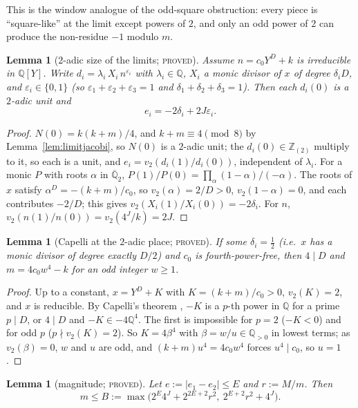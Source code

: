 \documentclass[11pt,reqno]{amsart}
\newtheorem{lemma}[theorem]{Lemma}
\theoremstyle{definition}
\newcommand{\Z}{\mathbb Z}
\newcommand{\Q}{\mathbb Q}
\newcommand{\status}[1]{\textup{\textsc{#1}}}
\begin{document}
This is the window analogue of the odd-square obstruction: every piece is
``square-like'' at the limit except powers of $2$, and only an odd power of
$2$ can produce the non-residue $-1$ modulo $m$.

\begin{lemma}[$2$-adic size of the limits; \status{proved}]\label{lem:twoadic}
Assume $n=c_0Y^D+k$ is irreducible in $\Q[Y]$.  Write $d_i=\lambda_i\,X_i\,
n^{\varepsilon_i}$ with $\lambda_i\in\Q$, $X_i$ a monic divisor of $x$ of
degree $\delta_iD$, and $\varepsilon_i\in\{0,1\}$ \textup{(}so
$\varepsilon_1+\varepsilon_2+\varepsilon_3=1$ and
$\delta_1+\delta_2+\delta_3=1$\textup{)}.  Then each $d_i(0)$ is a $2$-adic
unit and
\[
  e_i=-2\delta_i+2J\varepsilon_i .
\]
\end{lemma}

\begin{proof}
$N(0)=k(k+m)/4$, and $k+m\equiv4\pmod8$ by Lemma~\ref{lem:limitjacobi}, so
$N(0)$ is a $2$-adic unit; the $d_i(0)\in\Z_{(2)}$ multiply to it, so each is
a unit, and $e_i=v_2(d_i(1)/d_i(0))$, independent of $\lambda_i$.  For a
monic $P$ with roots $\alpha$ in $\overline{\Q}_2$,
$P(1)/P(0)=\prod_\alpha(1-\alpha)/(-\alpha)$.  The roots of $x$ satisfy
$\alpha^D=-(k+m)/c_0$, so $v_2(\alpha)=2/D>0$, $v_2(1-\alpha)=0$, and each
contributes $-2/D$; this gives $v_2(X_i(1)/X_i(0))=-2\delta_i$.  For $n$,
$v_2(n(1)/n(0))=v_2(4^J/k)=2J$.
\end{proof}

\begin{lemma}[Capelli at the $2$-adic place; \status{proved}]\label{lem:capelli}
If some $\delta_i=\frac12$ \textup{(}i.e.\ $x$ has a monic divisor of degree
exactly $D/2$\textup{)} and $c_0$ is fourth-power-free, then $4\mid D$ and
$m=4c_0w^4-k$ for an odd integer $w\ge1$.
\end{lemma}

\begin{proof}
Up to a constant, $x=Y^D+K$ with $K=(k+m)/c_0>0$, $v_2(K)=2$, and $x$ is
reducible.  By Capelli's theorem \cite[Ch.~VI, Thm.~9.1]{Lang}, $-K$ is a
$p$-th power in $\Q$ for a prime $p\mid D$, or $4\mid D$ and $-K\in-4\Q^4$.
The first is impossible for $p=2$ ($-K<0$) and for odd $p$ ($p\nmid
v_2(K)=2$).  So $K=4\beta^4$ with $\beta=w/u\in\Q_{>0}$ in lowest terms; as
$v_2(\beta)=0$, $w$ and $u$ are odd, and $(k+m)u^4=4c_0w^4$ forces $u^4\mid
c_0$, so $u=1$.
\end{proof}

\begin{lemma}[magnitude; \status{proved}]\label{lem:magnitude}
Let $e:=|e_1-e_2|\le E$ and $r:=M/m$.  Then
\[
 m\le B:=\max\bigl(2^E4^J+2^{2E+2}r^2,\ 2^{E+2}r^2+4^J\bigr).
\]
\end{lemma}
\end{document}
